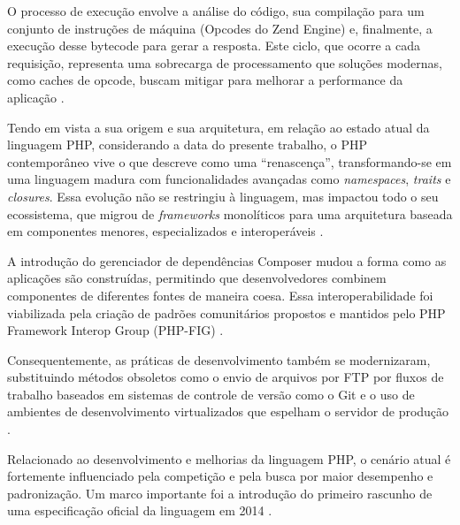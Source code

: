    \par O processo de execução envolve a análise do código, sua compilação para um conjunto de instruções de máquina (Opcodes do Zend Engine) e, finalmente, a execução desse bytecode para gerar a resposta. Este ciclo, que ocorre a cada requisição, representa uma sobrecarga de processamento que soluções modernas, como caches de opcode, buscam mitigar para melhorar a performance da aplicação \cite{livro:lockhart:2015:php}.

    \par Tendo em vista a sua origem e sua arquitetura, em relação ao estado atual da linguagem PHP, considerando a data do presente trabalho, o PHP contemporâneo vive o que \cite{livro:lockhart:2015:php} descreve como uma ``renascença'', transformando-se em uma linguagem madura com funcionalidades avançadas como \textit{namespaces}, \textit{traits} e \textit{closures}. Essa evolução não se restringiu à linguagem, mas impactou todo o seu ecossistema, que migrou de \textit{frameworks} monolíticos para uma arquitetura baseada em componentes menores, especializados e interoperáveis \cite{livro:lockhart:2015:php}. 
    
    \par A introdução do gerenciador de dependências Composer mudou a forma como as aplicações são construídas, permitindo que desenvolvedores combinem componentes de diferentes fontes de maneira coesa. Essa interoperabilidade foi viabilizada pela criação de padrões comunitários propostos e mantidos pelo PHP Framework Interop Group (PHP-FIG) \cite{livro:lockhart:2015:php}.
    
    \par Consequentemente, as práticas de desenvolvimento também se modernizaram, substituindo métodos obsoletos como o envio de arquivos por FTP por fluxos de trabalho baseados em sistemas de controle de versão como o Git e o uso de ambientes de desenvolvimento virtualizados que espelham o servidor de produção \cite{livro:lockhart:2015:php}.

    \par Relacionado ao desenvolvimento e melhorias da linguagem PHP, o cenário atual é fortemente influenciado pela competição e pela busca por maior desempenho e padronização. Um marco importante foi a introdução do primeiro rascunho de uma especificação oficial da linguagem em 2014 \cite{livro:lockhart:2015:php}.